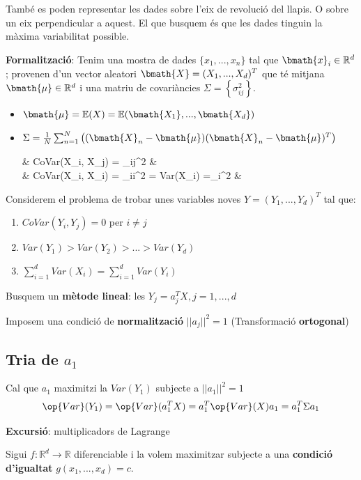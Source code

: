 També es poden representar les dades sobre l'eix de revolució del llapis. O sobre un eix perpendicular a aquest. El que busquem és que les dades tinguin la màxima variabilitat possible.

\textbf{Formalització}: Tenim una mostra de dades $\{x_1, ..., x_n\}$ tal que $\bmath{x}_i \in \mathbb{R}^d$; provenen d'un vector aleatori $\bmath{X} = (X_1, ..., X_d)^T$ que té mitjana $\bmath{\mu} \in \mathbb{R}^d$ i una matriu de covariàncies $\Sigma = \left\{ \sigma_{ij}^2 \right\}$.

\begin{itemize}
	\item $\bmath{\mu} = \mathbb{E}(X) = \mathbb{E}(\bmath{X_1}, ..., \bmath{X_d})$
	\item $\Sigma = \frac{1}{N} \sum_{n=1}^N \left((\bmath{X}_n - \bmath{\mu})(\bmath{X}_n - \bmath{\mu})^T\right)$
	
	\begin{flalign*}
	 & CoVar(X_i, X_j) = \sigma_{ij}^2  &\\
 & CoVar(X_i, X_i) = \sigma_{ii}^2 = Var(X_i) =\sigma_i^2 &
	\end{flalign*}
\end{itemize}

Considerem el problema de trobar unes variables noves $Y = (Y_1, ..., Y_d)^T$ tal que:

\begin{enumerate}
	\item $CoVar(Y_i, Y_j) = 0$ per $i \ne j$
	\item $Var(Y_1) > Var(Y_2) > ... > Var(Y_d)$
	\item $\sum_{i=1}^d Var(X_i) = \sum_{i=1}^d Var(Y_i)$
\end{enumerate}

Busquem un \textbf{mètode lineal}: les $Y_j = a_j^TX, j=1,...,d$

Imposem una condició de \textbf{normalització} $||a_j||^2 = 1$ 
(Transformació \textbf{ortogonal})

\subsection{Tria de $a_1$}
Cal que $a_1$ maximitzi la $Var(Y_1)$ subjecte a $||a_1||^2=1$
$$ \op{Var}(Y_1) = \op{Var}(a_1^TX) = a_1^T \op{Var}(X)a_1 = a_1^T\Sigma a_1 $$

\textbf{Excursió}: multiplicadors de Lagrange

Sigui $f:\mathbb{R}^d \rightarrow \mathbb{R}$ diferenciable i la volem maximitzar subjecte a una \textbf{condició d'igualtat} $g(x_1, ..., x_d) = c$.

